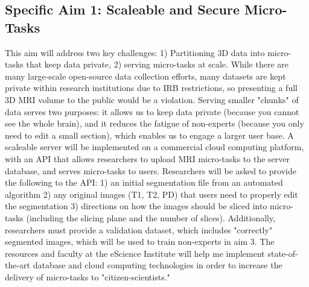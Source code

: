 \subsection*{Specific Aim 1: Scaleable and Secure Micro-Tasks}

This aim will address two key challenges: 1) Partitioning 3D data into micro-tasks that keep data private, 2) serving micro-tasks at scale. While there are many large-scale open-source data collection efforts, many datasets are kept private within research institutions due to  IRB restrictions, so presenting a full 3D MRI volume to the public would be a violation. Serving smaller "chunks" of data serves two purposes: it allows us to keep data private (because you cannot see the whole brain), and it reduces the fatigue of non-experts (because you only need to edit a small section), which enables us to engage a larger user base. A scaleable server will be implemented on a commercial cloud computing platform, with an API that allows researchers to upload MRI micro-tasks to the server database, and serves micro-tasks to users. Researchers will be asked to provide the following to the API: 1) an initial segmentation file from an automated algorithm 2) any original images (T1, T2, PD) that users need to properly edit the segmentation 3) directions on how the images should be sliced into micro-tasks (including the slicing plane and the number of slices). Additionally, researchers must provide a validation dataset, which includes "correctly" segmented images, which will be used to train non-experts in aim 3. The resources and faculty at the eScience Institute will help me implement state-of-the-art database and cloud computing technologies in order to increase the delivery of micro-tasks to "citizen-scientists."